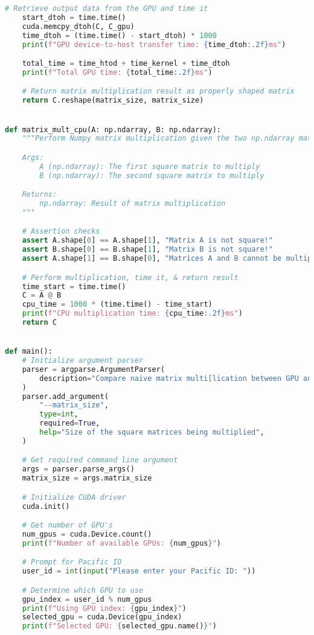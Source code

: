 \documentclass[11pt,twoside]{article}
\begin{document}
\begin{enumerate}
\begin{lstlisting}[language=Python]
    # Retrieve output data from the GPU and time it
    start_dtoh = time.time()
    cuda.memcpy_dtoh(C, C_gpu)
    time_dtoh = (time.time() - start_dtoh) * 1000
    print(f"GPU device-to-host transfer time: {time_dtoh:.2f}ms")

    total_time = time_htod + time_kernel + time_dtoh
    print(f"Total GPU time: {total_time:.2f}ms")

    # Return matrix multiplication result as properly shaped matrix
    return C.reshape(matrix_size, matrix_size)


def matrix_mult_cpu(A: np.ndarray, B: np.ndarray):
    """Perform Numpy matrix multiplication given the two np.ndarray matrices

    Args:
        A (np.ndarray): The first square matrix to multiply
        B (np.ndarray): The second square matrix to multiply

    Returns:
        np.ndarray: Result of matrix multiplication
    """

    # Assertion checks
    assert A.shape[0] == A.shape[1], "Matrix A is not square!"
    assert B.shape[0] == B.shape[1], "Matrix B is not square!"
    assert A.shape[1] == B.shape[0], "Matrices A and B cannot be multiplied!"

    # Perform multiplication, time it, & return result
    time_start = time.time()
    C = A @ B
    cpu_time = 1000 * (time.time() - time_start)
    print(f"CPU multiplication time: {cpu_time:.2f}ms")
    return C


def main():
    # Initialize argument parser
    parser = argparse.ArgumentParser(
        description="Compare naive matrix multi[lication between GPU and CPU"
    )
    parser.add_argument(
        "--matrix_size",
        type=int,
        required=True,
        help="Size of the square matrices being multiplied",
    )

    # Get required command line argument
    args = parser.parse_args()
    matrix_size = args.matrix_size

    # Initialize CUDA driver
    cuda.init()

    # Get number of GPU's
    num_gpus = cuda.Device.count()
    print(f"Number of available GPUs: {num_gpus}")

    # Prompt for Pacific ID
    user_id = int(input("Please enter your Pacific ID: "))

    # Determine which GPU to use
    gpu_index = user_id % num_gpus
    print(f"Using GPU index: {gpu_index}")
    selected_gpu = cuda.Device(gpu_index)
    print(f"Selected GPU: {selected_gpu.name()}")


\end{lstlisting}
\end{enumerate}
\end{document}
